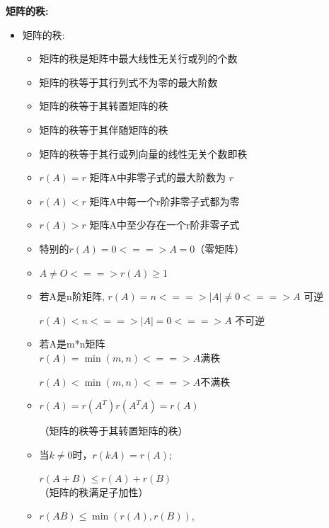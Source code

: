 \documentclass[10pt]{article}
\begin{document}
\begin{multicols}{2}
\textbf{矩阵的秩:}
\begin{itemize}
  \item 矩阵的秩:
    \begin{itemize}
      \item 矩阵的秩是矩阵中最大线性无关行或列的个数
      \item 矩阵的秩等于其行列式不为零的最大阶数
      \item 矩阵的秩等于其转置矩阵的秩
      \item 矩阵的秩等于其伴随矩阵的秩
      \item 矩阵的秩等于其行或列向量的线性无关个数即秩
      \item \( r(A) = r \) 矩阵A中非零子式的最大阶数为 \(r\)
      \item \( r(A) < r \) 矩阵A中每一个r阶非零子式都为零
      \item \( r(A) > r \) 矩阵A中至少存在一个r阶非零子式
      \item 特别的\( r(A) = 0 <==> A = 0 \)（零矩阵）
      \item \( A \neq O <==> r(A) \geq 1 \)
      \item 若A是n阶矩阵,
      \( r(A) = n <==> |A| \neq 0 <==> A \text{ 可逆} \)

      \( r(A) < n <==> |A| = 0 <==> A \text{ 不可逆} \)
      \item 若A是m*n矩阵\\
      \( r(A) = \min(m, n) <==> A \text{满秩} \)
      
      \( r(A) < \min(m, n) <==> A \text{不满秩} \)

      \item \( r(A) = r(A^T) \)\( r(A^T A) = r(A) \)
      
      （矩阵的秩等于其转置矩阵的秩）
      \item 当\( k \neq 0 \)时，\( r(kA) = r(A) \);
      
      \( r(A+B) \leq r(A) + r(B) \)\\（矩阵的秩满足子加性）
      \item \( r(AB) \leq \min(r(A), r(B)) \),
      

\end{itemize}
\end{itemize}
\end{multicols}
\end{document}
